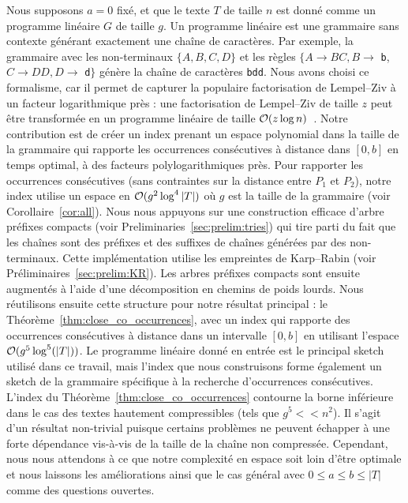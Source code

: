 Nous supposons $a=0$ fixé, et que le texte $T$ de taille $n$ est donné comme un programme linéaire $G$ de taille $g$. Un programme linéaire est une grammaire sans contexte générant exactement une chaîne de caractères. Par exemple, la grammaire avec les non-terminaux $\{A,B,C,D\}$ et les règles $\{A \rightarrow BC, B \rightarrow$ \texttt{b}, $ C \rightarrow DD, D\rightarrow$ \texttt{d}$\}$ génère la chaîne de caractères \texttt{bdd}.
Nous avons choisi ce formalisme, car il permet de capturer la populaire factorisation de Lempel--Ziv à un facteur logarithmique près : une factorisation de Lempel--Ziv de taille $z$ peut être transformée en un programme linéaire de taille $\mathcal{O}(z\log n)$~\cite{CharikarLLPPRSS02,Rytter02}.
%
Notre contribution est de créer un index prenant un espace polynomial dans la taille de la grammaire qui rapporte les occurrences consécutives à distance dans $[0,b]$ en temps optimal, à des facteurs polylogarithmiques près.
Pour rapporter les occurrences consécutives (sans contraintes sur la distance entre $P_1$ et $P_2$), notre index utilise un espace en $\mathcal{O}(g^2\log^4|T|)$ où $g$ est la taille de la grammaire (voir Corollaire~\ref{cor:all}).
%
Nous nous appuyons sur une construction efficace d'arbre préfixes compacts (voir Preliminaries~\ref{sec:prelim:tries}) qui tire parti du fait que les chaînes sont des préfixes et des suffixes de chaînes générées par des non-terminaux. Cette implémentation utilise les empreintes de Karp--Rabin (voir Préliminaires~\ref{sec:prelim:KR}). Les arbres préfixes compacts sont ensuite augmentés à l'aide d'une décomposition en chemins de poids lourds.
Nous réutilisons ensuite cette structure pour notre résultat principal : le Théorème~\ref{thm:close_co_occurrences}, avec un index qui rapporte des occurrences consécutives à distance dans un intervalle $[0,b]$ en utilisant l'espace $\mathcal{O} (g^5\log^5(|T|))$.
%
Le programme linéaire donné en entrée est le principal sketch utilisé dans ce travail, mais l'index que nous construisons forme également un sketch de la grammaire spécifique à la recherche d'occurrences consécutives.
%
L'index du Théorème~\ref{thm:close_co_occurrences} contourne la borne inférieure dans le cas des textes hautement compressibles (tels que $g^5 << n^2$). Il s'agit d'un résultat non-trivial puisque certains problèmes ne peuvent échapper à une forte dépendance vis-à-vis de la taille de la chaîne non compressée. Cependant, nous nous attendons à ce que notre complexité en espace soit loin d'être optimale et nous laissons les améliorations ainsi que le cas général avec $0 \leq a \leq b \leq |T|$ comme des questions ouvertes.


